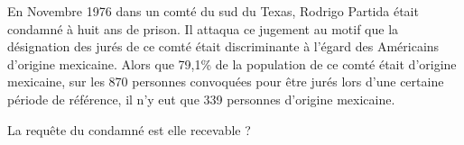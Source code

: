 
En Novembre 1976 dans un comté du sud du Texas, Rodrigo Partida était condamné à huit ans de prison. Il attaqua ce jugement au motif que la désignation des jurés de ce comté était discriminante à l'égard des Américains d'origine
mexicaine. Alors que 79,1\% de la population de ce comté était d'origine mexicaine, sur les 870 personnes convoquées
pour être jurés lors d'une certaine période de référence, il n'y eut que 339 personnes d'origine mexicaine.

La requête du condamné est elle recevable  ?
